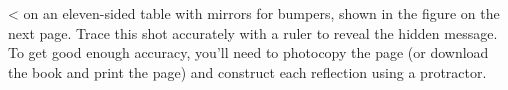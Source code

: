 <%
on an eleven-sided table with mirrors for bumpers, shown in the figure on the next
page. Trace
this shot accurately with a ruler to reveal the hidden
message. To get good enough accuracy, you'll need to
photocopy the page (or download the book and print the page)
and construct each reflection using a protractor.
